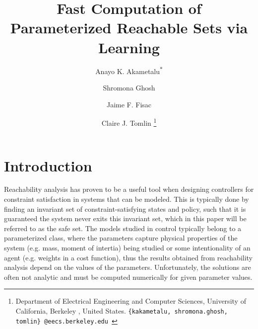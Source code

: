 \documentclass[letterpaper, 10 pt, conference]{ieeeconf}
\title{\LARGE \bf
Fast Computation of Parameterized Reachable Sets via Learning 
}
\author{
Anayo K. Akametalu\textsuperscript{$*$} \and Shromona Ghosh \and Jaime F. Fisac \and Claire J. Tomlin
\thanks{
 Department of Electrical Engineering and Computer Sciences, 
        University of California, Berkeley , United States.\newline
        {\tt\small \{kakametalu, shromona.ghosh, tomlin\}~@eecs.berkeley.edu }}%
}
\begin{document}
\maketitle
\thispagestyle{empty}
\pagestyle{empty}



\section{Introduction}
Reachability analysis has proven to be a useful tool when designing controllers for constraint satisfaction in systems that can be modeled. This is typically done by finding an invariant set of constraint-satisfying states and policy, such that it is guaranteed the system never exits this invariant set, which in this paper will be referred to as the safe set. The models studied in control typically belong to a parameterized class, where the parameters capture physical properties of the system (e.g. mass, moment of intertia) being studied or some intentionality of an agent (e.g. weights in a cost function), thus the results obtained from reachability analysis depend on the values of the parameters. Unfortunately, the solutions are often not analytic and must be computed numerically for given parameter values.
\end{document}

